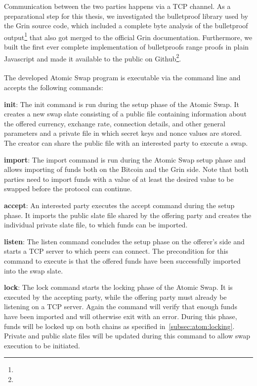 Communication between the two parties happens via a TCP channel.
As a preparational step for this thesis, we investigated the bulletproof library used by the Grin source code, which included a complete byte analysis of the bulletproof output\footnote{\urlrpbytes} that also got merged to the official Grin documentation.
Furthermore, we built the first ever complete implementation of bulletproofs range proofs in plain Javascript and made it available to the public on Github\footnote{\urlbpjs}.
\\ \\
The developed Atomic Swap program is executable via the command line and accepts the following commands:
\begin{asparaitem}
    \item \textbf{init}: The init command is run during the setup phase of the Atomic Swap.
    It creates a new swap slate consisting of a public file containing information about the offered currency, exchange rate, connection details, and other general parameters and a private file in which secret keys and nonce values are stored.
    The creator can share the public file with an interested party to execute a swap.
    \item \textbf{import}: The import command is run during the Atomic Swap setup phase and allows importing of funds both on the Bitcoin and the Grin side.
    Note that both parties need to import funds with a value of at least the desired value to be swapped before the protocol can continue.
    \item \textbf{accept}: An interested party executes the accept command during the setup phase.
    It imports the public slate file shared by the offering party and creates the individual private slate file, to which funds can be imported.
    \item \textbf{listen}: The listen command concludes the setup phase on the offerer's side and starts a TCP server to which peers can connect.
    The precondition for this command to execute is that the offered funds have been successfully imported into the swap slate.
    \item \textbf{lock}: The lock command starts the locking phase of the Atomic Swap.
    It is executed by the accepting party, while the offering party must already be listening on a TCP server.
    Again the command will verify that enough funds have been imported and will otherwise exit with an error.
    During this phase, funds will be locked up on both chains as specified in~\cref{subsec:atom:locking}.
    Private and public slate files will be updated during this command to allow swap execution to be initiated.

\end{asparaitem}
